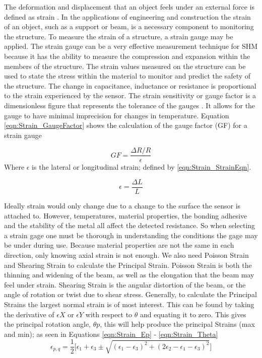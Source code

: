 \indent The deformation and displacement that an object feels under an external force is defined as strain \cite{OmegaEngineeering:2013}. In the applications of engineering and construction the strain of an object, such as a support or beam, is a necessary component to monitoring the structure. To measure the strain of a structure, a strain gauge may be applied. The strain gauge can be a very effective measurement technique for SHM because it has the ability to measure the compression and expansion within the members of the structure. The strain values measured on the structure can be used to state the stress within the material to monitor and predict the safety of the structure. The change in capacitance, inductance or resistance is proportional to the strain experienced by the sensor. The strain sensitivity or gauge factor is a dimensionless figure that represents the tolerance of the gauges . It allows for the gauge to have minimal imprecision for changes in temperature. Equation \ref{eqn:Strain_GaugeFactor} shows the calculation of the gauge factor (GF) for a strain gauge

\begin{equation}
GF = \frac{\Delta R / R}{\epsilon} 
\label{eqn:Strain_GaugeFactor}
\end{equation}
\indent Where $\epsilon$ is the lateral or longitudinal strain; defined by \ref{eqn:Strain_StrainEqn}.

\begin{equation}
\epsilon = \frac{\Delta L}{L}
\label{eqn:Strain_StrainEqn}
\end{equation} 

\indent Ideally strain would only change due to a change to the surface the sensor is attached to. However, temperatures, material properties, the bonding adhesive and the stability of the metal all affect the detected resistance. So when selecting a strain gage one must be thorough in understanding the conditions the gage may be under during use. Because material properties are not the same in each direction, only knowing axial strain is not enough. We also need Poisson Strain and Shearing Strain to calculate the Principal Strain. Poisson Strain is both the thinning and widening of the beam, as well as the elongation that the beam may feel under strain. Shearing Strain is the angular distortion of the beam, or the angle of rotation or twist due to shear stress. Generally, to calculate the Principal Strains the largest normal strain is of most interest. This can be found by taking the derivative of $\epsilon X$ or $\epsilon Y$ with respect to $\theta$ and equating it to zero. This gives the principal rotation angle, $\theta p$, this will help produce the principal Strains (max and min); as seen in Equations \ref{eqn:Strain_Ep} - \ref{eqn:Strain_Theta}
\begin{equation}
\epsilon_{p,q} = \frac{1}{2}\biggl[\epsilon_{1} + \epsilon_{3} \pm \sqrt{(\epsilon_{1}-\epsilon_{3})^{2}+(2\epsilon_{2}-\epsilon_{1}-\epsilon_{3})^{2}}\biggr]
\label{eqn:Strain_Ep}
\end{equation}

